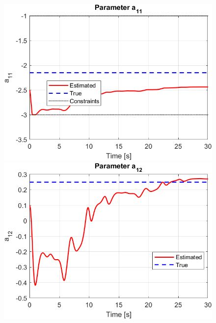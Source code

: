 \documentclass[12pt]{article} %
\numberwithin{equation}{section}  %
\begin{document}
\begin{figure}[ht!]
\begin{minipage}{0.32\textwidth}
    \end{minipage}
    
    \caption{}
    \label{fig:err}
\end{figure}

\begin{figure}[ht!]
    \centering
    \begin{minipage}{0.48\textwidth}
        \centering
        \includegraphics[width=0.8\linewidth]{plots/plot3_a_a11.png}
    \end{minipage}
    \hfill
    \begin{minipage}{0.48\textwidth}
        \centering
        \includegraphics[width=0.8\linewidth]{plots/plot3_b_a12.png}
    \end{minipage}
    
    \vspace{1em} %
    

\end{figure}
\end{document}
